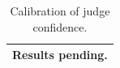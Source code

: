 \begin{table}[t]
\centering\small
\begin{tabular}{l}
\toprule
Results pending. \\
\bottomrule
\end{tabular}
\caption{Calibration of judge confidence.}
\label{tab:calibration}
\end{table}
